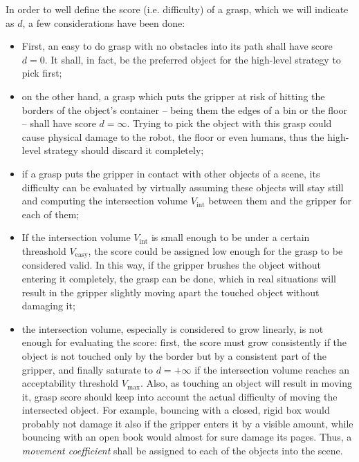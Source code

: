 In order to well define the score (i.e. difficulty) of a grasp, which we will
indicate as $d$, a few
considerations have been done:
\begin{itemize}
  \item{First, an easy to do grasp with no obstacles
      into its path shall have score $d=0$. It shall, in fact, be  the preferred
    object for the high-level strategy to pick first;}
  \item{on the other hand, a grasp which puts the
      gripper at risk of hitting the borders of the object's container -- being them
      the edges of a bin or the floor -- shall have score $d=\infty$. Trying to pick the
      object with this grasp could cause physical damage to the robot, the floor or
    even humans, thus the high-level strategy should discard it completely;}
  \item{if a grasp puts the gripper in contact with other objects of a scene, its
      difficulty can be evaluated by virtually assuming these objects will stay still and
      computing the intersection volume $V_{\text{int}}$ between them and the
      gripper for each of them;}
    \item{If the intersection volume $V_{\text{int}}$ is small enough to be
        under a certain threashold $V_{\text{easy}}$, the score could be assigned low enough for the
      grasp to be considered valid. In this way, if the gripper brushes the object
      without entering it completely, the grasp can be done, which in real situations
      will result in the gripper slightly moving apart the touched object without
    damaging it; }
  \item{the intersection volume, especially is considered to grow linearly, is not
      enough for evaluating the score: first, the score must grow consistently if the
      object is not touched only by the border but by a consistent part of the
      gripper, and finally saturate to $d=+\infty$ if the intersection volume
      reaches an acceptability threshold $V_{\text{max}}$. Also, as touching an object will result in moving it, grasp score
      should keep into account the actual difficulty of moving the intersected
      object. For example, bouncing with a closed, rigid box would probably not damage it
      also if the gripper enters it by a visible amount, while bouncing with an
      open book would almost for sure damage its pages. Thus, a \emph{movement
    coefficient} shall be assigned to each of the objects into the scene.}
\end{itemize}


